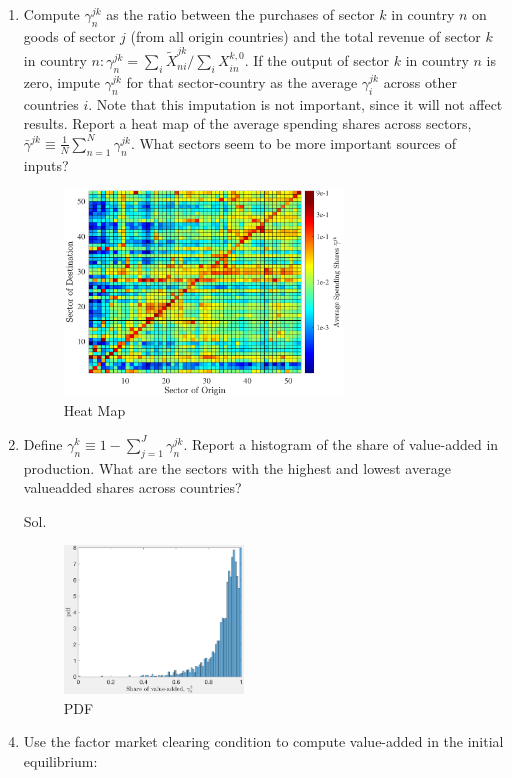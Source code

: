 \documentclass[12pt,oneside,reqno]{article}
\begin{document}
\begin{enumerate}[label=\roman*., leftmargin=*]
\begin{enumerate}
\item Compute $\gamma_{n}^{j k}$ as the ratio between the purchases of sector $k$ in country $n$ on goods of sector $j$ (from all origin countries) and the total revenue of sector $k$ in country $n: \gamma_{n}^{j k}=\sum_{i} \tilde{X}_{n i}^{j k} / \sum_{i} X_{i n}^{k, 0}$. If the output of sector $k$ in country $n$ is zero, impute $\gamma_{n}^{j k}$ for that sector-country as the average $\gamma_{i}^{j k}$ across other countries $i$. Note that this imputation is not important, since it will not affect results. Report a heat map of the average spending shares across sectors, $\bar{\gamma}^{j k} \equiv \frac{1}{N} \sum_{n=1}^{N} \gamma_{n}^{j k}$. What sectors seem to be more important sources of inputs?
\begin{figure}[htb]
    \centering
    \includegraphics[width=0.7\textwidth]{Assignment 2/Figures/heatmap-ic.pdf}
    \caption{Heat Map}
\end{figure}
\FloatBarrier
\item Define $\gamma_{n}^{k} \equiv 1-\sum_{j=1}^{J} \gamma_{n}^{j k}$. Report a histogram of the share of value-added in production. What are the sectors with the highest and lowest average valueadded shares across countries?
\item[Sol.] \begin{figure}[htb]
    \centering
    \includegraphics[width=0.45\textwidth]{Assignment 2/Figures/pdf-id.pdf}
    \caption{PDF}
\end{figure}
\FloatBarrier
\item Use the factor market clearing condition to compute value-added in the initial equilibrium:


\end{enumerate}
\end{enumerate}
\end{document}
